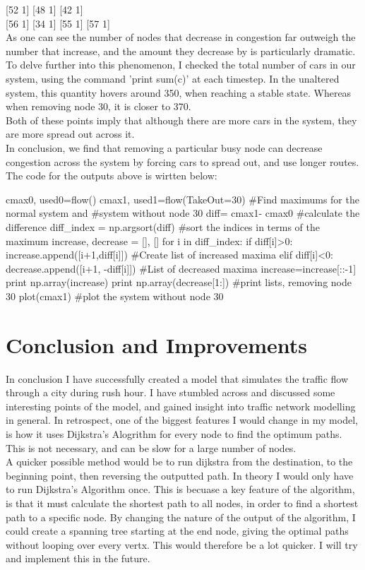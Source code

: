 \documentclass[paper=a4, fontsize=12pt]{scrartcl} %
\numberwithin{equation}{section}       %
\numberwithin{figure}{section}         %
\numberwithin{table}{section}          %
\begin{document}
[52  1]
[48  1]
[42  1]
{\\}[56  1]
[34  1]
[55  1]
[57  1]
\\As one can see the number of nodes that decrease in congestion far outweigh the number that increase, and the amount they decrease by is particularly dramatic. 
\\To delve further into this phenomenon, I checked the total number of cars in our system, using the command 'print sum(c)' at each timestep. In the unaltered system, this quantity hovers around 350, when reaching a stable state. Whereas when removing node 30, it is closer to 370.\\
Both of these points imply that although there are more cars in the system, they are more spread out across it. \\
In conclusion, we find that removing a particular busy node can decrease congestion across the system by forcing cars to spread out, and use longer routes.
The code for the outputs above is wirtten below:
\begin{python}
	cmax0, used0=flow()
	cmax1, used1=flow(TakeOut=30)
	#Find maximums for the normal system and 
	#system without node 30
	diff= cmax1- cmax0
	#calculate the difference
	diff_index = np.argsort(diff)
	#sort the indices in terms of the maximum
	increase, decrease = [], []
	for i in diff_index:
		if diff[i]>0:
			increase.append([i+1,diff[i]])
			#Create list of increased maxima
		elif diff[i]<0:
			decrease.append([i+1, -diff[i]])
			#List of decreased maxima
	increase=increase[::-1]
	print np.array(increase)
	print np.array(decrease[1:])
	#print lists, removing node 30
	plot(cmax1)
	#plot the system without node 30
\end{python}
\section{Conclusion and Improvements}
In conclusion I have successfully created a model that simulates the traffic flow through a city during rush hour. I have stumbled across and discussed some interesting points of the model, and gained insight into traffic network modelling in general.  
In retrospect, one of the biggest features I would change in my model, is how it uses Dijkstra's Alogrithm  for every node to find the optimum paths. This is not necessary, and can be slow for a large number of nodes. \\
A quicker possible method would be to run dijkstra from the destination, to the beginning point, then reversing the outputted path. In theory I would only have to run Dijkstra's Algorithm once. This is becuase a key feature of the algorithm, is that it must calculate the shortest path to all nodes, in order to find a shortest path to a specific node. By changing the nature of the output of the algorithm, I could create a spanning tree starting at the end node, giving the optimal paths without looping over every vertx. This would therefore be a lot quicker. I will try and implement this in the future.
\end{document}
